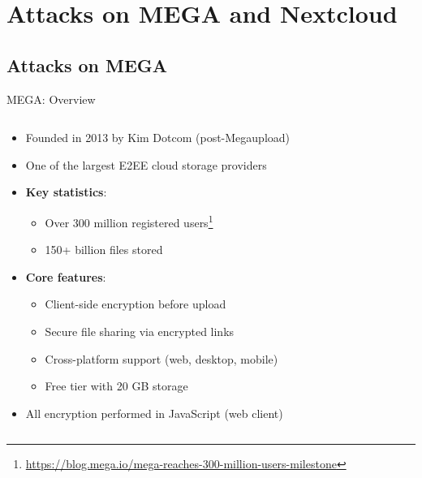 \documentclass[aspectratio=169, lualatex, handout]{beamer}
\begin{document}
\section{Attacks on MEGA and Nextcloud}

\subsection{Attacks on MEGA}

\begin{frame}{MEGA: Overview}
	\begin{columns}[c]
		\begin{column}{0.75\textwidth}
			\begin{itemize}
				\item Founded in 2013 by Kim Dotcom (post-Megaupload)
				\item One of the largest E2EE cloud storage providers
				\item \textbf{Key statistics}:
				      \begin{itemize}
					      \item Over 300 million registered users\footnote{\url{https://blog.mega.io/mega-reaches-300-million-users-milestone}}
					      \item 150+ billion files stored
				      \end{itemize}
				\item \textbf{Core features}:
				      \begin{itemize}
					      \item Client-side encryption before upload
					      \item Secure file sharing via encrypted links
					      \item Cross-platform support (web, desktop, mobile)
					      \item Free tier with 20 GB storage
				      \end{itemize}
				\item All encryption performed in JavaScript (web client)
			\end{itemize}
		\end{column}
		\begin{column}{0.25\textwidth}
		\end{column}
	\end{columns}
\end{frame}
\end{document}

